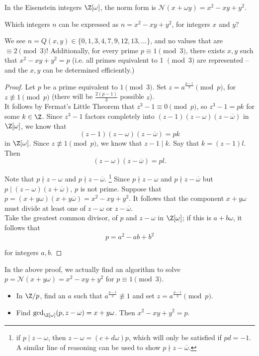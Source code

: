\documentclass[11pt]{article}
\begin{document}
In the Eisenstein integers $\Z[\omega]$, the norm form is $\mathcal{N}(x+\omega y) = x^2 - xy + y^2$.

\begin{exercise}
Which integers $n$ can be expressed as $n = x^2 - xy + y^2$, for integers $x$ and $y$?    
\end{exercise}

\begin{answer}
We see $n = Q(x, y) \in \{0, 1, 3, 4, 7, 9, 12, 13, \dots\}$, and no values that are $\equiv 2 \pmod 3$! 
Additionally, for every prime $p \equiv 1 \pmod{3}$, there exists $x, y$ such that $x^2 - xy + y^2 = p$ (i.e. all primes equivalent to 1 $\pmod 3$ are represented 
-- and the $x, y$ can be determined efficiently.)    
\end{answer}

\begin{proof}
Let $p$ be a prime equivalent to $1 \pmod 3$. Set $z = a^{\frac{p-1}{3}} \pmod{p}$, for $z \not\equiv 1 \pmod{p}$ (there will be $\frac{2(p-1)}{3}$ possible $z$).\\

It follows by Fermat's Little Theorem that $z^3 - 1 \equiv 0 \pmod p$, so $z^3 - 1 = pk$ for some $k \in \Z$.
Since $z^3 - 1$ factors completely into $(z-1)(z-\omega)(z-\overline{\omega})$ in $\Z[\omega]$, we know that
\[
    (z-1)(z-\omega)(z-\overline{\omega}) = pk
\]
in $\Z[\omega]$. Since $z \not\equiv 1 \pmod{p}$, we know that $z - 1 \mid k$. Say that $k = (z-1)l$. Then 
\[
    (z-\omega)(z-\overline{\omega}) = pl.
\]

Note that $p \nmid z-\omega$ and $p \nmid z-\overline{\omega}$.
\footnote{if $p \mid z-\omega$, then $z-\omega = (c+d\omega)p$, which will only be satisfied if $pd = -1$. A similar line of reasoning
can be used to show $p \nmid z-\overline{\omega}$.} Since $p \nmid z-\omega$ and $p \nmid z-\overline{\omega}$ but $p \mid (z-\omega)(z+\overline{\omega})$, $p$ is not prime. 
Suppose that $p = (x+y\omega)(x+y\overline{\omega}) = x^2 - xy + y^2$. It follows that the component $x + y\omega$ must divide at least one of $z-\omega$ or $z-\overline{\omega}$. \\

Take the greatest common divisor, of $p$ and $z - \omega$ in $\Z[\omega]$; if this is $a + b\omega$, it follows that
\[
    p = a^2 - ab + b^2
\]

for integers $a, b$.
\end{proof}

In the above proof, we actually find an algorithm to solve $p = \mathcal{N}(x+y\omega) = x^2 - xy + y^2$ for $p \equiv 1 \pmod 3$.
\begin{itemize}
    \item In $\Z /p$, find an $a$ such that $a^{\frac{p-1}{3}} \not\equiv 1$ and set $z = a^{\frac{p-1}{3}} \pmod p$.
    \item Find $\mathrm{gcd}_{\Z[\omega]}(p, z-\omega) = x+y\omega$. Then $x^2 - xy + y^2 = p$. 
\end{itemize}
\end{document}
